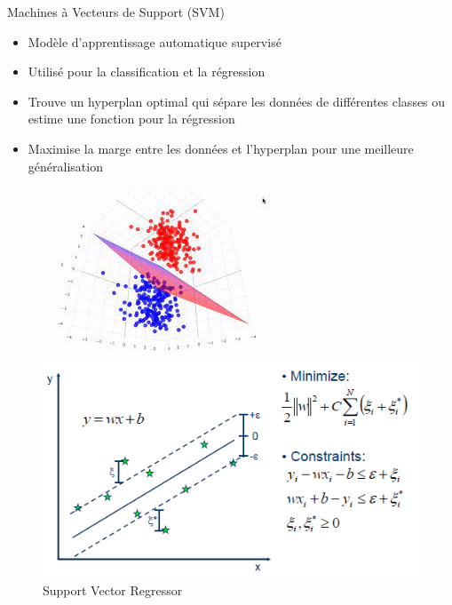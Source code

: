 \documentclass{beamer}
\begin{document}
\begin{frame}{Machines à Vecteurs de Support (SVM)}
	\begin{itemize}
		\item Modèle d'apprentissage automatique supervisé
		\item Utilisé pour la classification et la régression
		\item Trouve un hyperplan optimal qui sépare les données de différentes classes ou estime une fonction pour la régression
		\item Maximise la marge entre les données et l'hyperplan pour une meilleure généralisation
	\end{itemize}
	
	\begin{figure}
		\begin{minipage}[t]{0.45\linewidth}
			\includegraphics[width=\linewidth]{csvm.jpeg}
			\caption{Support Vector Classifier}
		\end{minipage}
		\hfill
		\begin{minipage}[t]{0.45\linewidth}
			\centering
			\includegraphics[width=\linewidth]{SVR_2.png}
			\caption{Support Vector Regressor}
		\end{minipage}
	\end{figure}
\end{frame}
\end{document}
